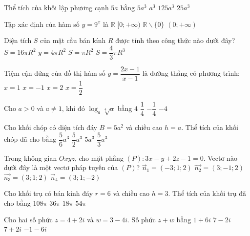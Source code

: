 \begin{ex}%
Thể tích của khối lập phương cạnh $5 a$ bằng
\choice
{$5 a^3$}
{$a^3$}
{\True $125 a^3$}
{$25 a^3$}

\end{ex}
\begin{ex}%
Tập xác định của hàm số $y=9^{x}$ là
\choice
{\True $\mathbb{R}$}
{$[0;+\infty)$}
{$\mathbb{R} \backslash\{0\}$}
{$(0;+\infty)$}

\end{ex}
\begin{ex}%
Diện tích $S$ của mặt cầu bán kính $R$ được tính theo công thức nào dưới đây?
\choice
{$S=16\pi R^2$}
{\True $y=4\pi R^2$}
{$S=\pi R^2$}
{$S=\dfrac{4}{3} \pi R^3$}

\end{ex}
\begin{ex}%
Tiệm cận đứng của đồ thị hàm số $y=\dfrac{2 x-1}{x-1}$ là đường thẳng có phương trình:
\choice
{\True $x=1$}
{$x=-1$}
{$x=2$}
{$x=\dfrac{1}{2}$}

\end{ex}
\begin{ex}%
Cho $a>0$ và $a \neq 1$, khi đó $\log_a \sqrt[4]{a}$ bằng
\choice
{$4$}
{\True $\dfrac{1}{4}$}
{$-\dfrac{1}{4}$}
{$-4$}

\end{ex}
\begin{ex}%
Cho khối chóp có diện tích đáy $B=5 a^2$ và chiều cao $h=a$. Thể tích của khối chóp đã cho bằng
\choice
{$\dfrac{5}{6} a^3$}
{$\dfrac{5}{2} a^3$}
{$5 a^3$}
{\True $\dfrac{5}{3} a^3$}

\end{ex}
\begin{ex}%
Trong không gian $O x y z$, cho mặt phẳng $(P)\colon 3 x-y+2 z-1=0$. Vectơ nào dưới đây là một vectơ pháp tuyến của $(P)$?
\choice
{$\vec{n}_1=(-3; 1; 2)$}
{\True $\overrightarrow{n_2}=(3;-1; 2)$}
{$\overrightarrow{n_3}=(3; 1; 2)$}
{$\vec{n}_4=(3; 1;-2)$}

\end{ex}
\begin{ex}%
Cho khối trụ có bán kính đáy $r=6$ và chiều cao $h=3$. Thể tích của khối trụ đã cho bằng
\choice
{\True $108\pi$}
{$36\pi$}
{$18\pi$}
{$54\pi$}

\end{ex}
\begin{ex}%
Cho hai số phức $z=4+2 i$ và $w=3-4 i$. Số phức $z+w$ bằng
\choice
{$1+6 i$}
{\True $7-2 i$}
{$7+2 i$}
{$-1-6 i$}

\end{ex}
